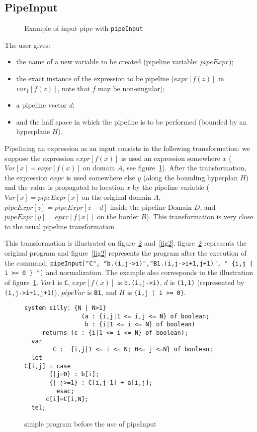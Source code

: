 \documentclass[a4paper,11pt]{article}
\begin{document}
\subsection{PipeInput}
\begin{figure}[ht]

\caption{Example of input pipe with {\tt pipeInput}}
\label{fig01}
\end{figure}

The user gives:
\begin{itemize}
\item the name of a new variable to be created 
 (pipeline variable: $pipeExpr$);
\item  the exact instance of 
the expression to be pipeline 
($expr[f(z)]$ in  $var_1[f(z)]$, note that $f$ may be non-singular);
\item  a pipeline vector
$d$;
\item and the half space  in which 
the pipeline is to be performed (bounded by an hyperplane $H$).
\end{itemize}

Pipelining an expression as
an input consists in the following transformation: we suppose the expression 
$expr[f(x)]$ is used 
an expression somewhere $x$  ($Var[x]=expr[f(x)]$ on domain $A$, 
see figure~\ref{fig01}).  After the transformation, 
the expression $expr$ is used somewhere else $y$ (along the bounding 
hyperplan $H$) and the value is propagated to location $x$ by the
pipeline variable ($Var[x]=pipeExpr[x]$ on the original domain $A$,
$pipeExpr[z]=pipeExpr[z-d]$ inside the pipeline Domain $D$,
 and $pipeExpr[y]=epxr[f[x]]$ on the border $B$).
This transformation is very close to the usual pipeline transformation

This transformation is illustrated on  figure~\ref{fig1}
and~\ref{fig2}. figure~\ref{fig1} represents the original program
and figure~\ref{fig2} represents the program after the execution of 
the command:  {\tt pipeInput["C", "b.(i,j->i)","B1.(i,j->i+1,j+1)",
" \{i,j | i >= 0 \} "]} and normalization.
 The example also corresponds to the illustration 
of figure~\ref{fig01}. $Var1$ is {\tt C}, $expr[f(x)]$ is {\tt b.(i,j->i)},
$d$ is {\tt (1,1)} (represented by {\tt (i,j->i+1,j+1)}),  $pipeVar$
is {\tt B1}, and $H$ is  {\tt \{i,j | i >= 0\}}. 


\begin{figure}[ht]
\begin{verbatim}
system silly: {N | N>1}
                (a : {i,j|1 <= i,j <= N} of boolean; 
                 b : {i|1 <= i <= N} of boolean)
     returns (c : {i|1 <= i <= N} of boolean);
  var 
        C :  {i,j|1 <= i <= N; 0<= j <=N} of boolean;
  let
C[i,j] = case
       {|j=0} : b[i];
       {| j>=1} : C[i,j-1] + a[i,j];
         esac;
      c[i]=C[i,N];
  tel;   
\end{verbatim}
\caption{simple program before the use of pipeInput}
\label{fig1}
\end{figure}
\end{document}
